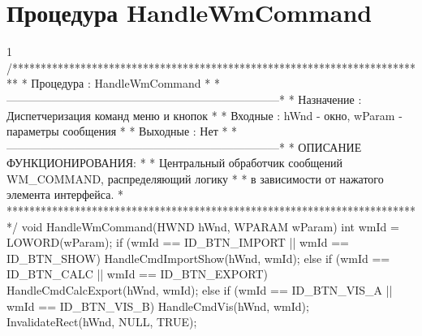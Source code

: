 \section{Процедура HandleWmCommand}
\footnotesize
\begin{listing}{1}
/*************************************************************************
* Процедура     : HandleWmCommand                                        *
*------------------------------------------------------------------------*
* Назначение    : Диспетчеризация команд меню и кнопок                   *
* Входные       : hWnd - окно, wParam - параметры сообщения              *
* Выходные      : Нет                                                    *
*------------------------------------------------------------------------*
* ОПИСАНИЕ ФУНКЦИОНИРОВАНИЯ:                                             *
* Центральный обработчик сообщений WM_COMMAND, распределяющий логику      *
* в зависимости от нажатого элемента интерфейса.                         *
*************************************************************************/
void HandleWmCommand(HWND hWnd, WPARAM wParam) {
    int wmId = LOWORD(wParam);
    if (wmId == ID_BTN_IMPORT || wmId == ID_BTN_SHOW) 
        HandleCmdImportShow(hWnd, wmId);
    else if (wmId == ID_BTN_CALC || wmId == ID_BTN_EXPORT) 
        HandleCmdCalcExport(hWnd, wmId);
    else if (wmId == ID_BTN_VIS_A || wmId == ID_BTN_VIS_B) 
        HandleCmdVis(hWnd, wmId);
    InvalidateRect(hWnd, NULL, TRUE);
}
\end{listing}
\normalsize

\pagebreak

